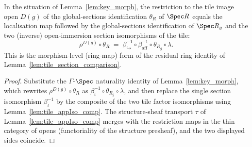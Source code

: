 \begin{lemma}
  \label{lem:tile_section_ring_identity}
  In the situation of Lemma~\ref{lem:key_morph}, the restriction to the tile image open \(D(g)\) of the
  global-sections identification \(\theta_R\) of \(\Spec R\) equals the localisation map followed by the
  global-sections identification of \(\Spec R_g\) and the two (inverse) open-immersion section
  isomorphisms of the tile:
  \[
    \rho^{D(g)} \circ \theta_R
    \;=\;
    \beta_{\hookrightarrow}^{-1} \circ \beta_{\mathrm{aff}}^{-1} \circ \theta_{R_g} \circ \lambda.
  \]
  This is the morphism-level (ring-map) form of the residual ring identity of
  Lemma~\ref{lem:tile_section_comparison}.
\end{lemma}
\begin{proof}
  \leanok
  Substitute the \(\Gamma\)-\(\Spec\) naturality identity of Lemma~\ref{lem:key_morph}, which rewrites
  \(\rho^{D(g)} \circ \theta_R\) as \(\beta_\iota^{-1} \circ \theta_{R_g} \circ \lambda\), and then
  replace the single section isomorphism \(\beta_\iota^{-1}\) by the composite of the two tile factor
  isomorphisms using Lemma~\ref{lem:tile_appIso_comp}. The structure-sheaf transport \(\tau\) of
  Lemma~\ref{lem:tile_appIso_comp} merges with the restriction maps in the thin category of opens
  (functoriality of the structure presheaf), and the two displayed sides coincide.
\end{proof}

